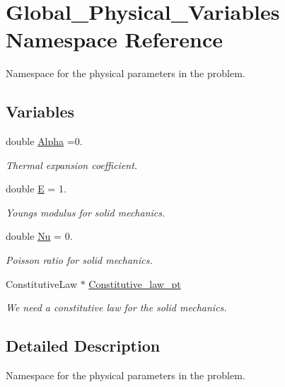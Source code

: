\hypertarget{namespaceGlobal__Physical__Variables}{}\section{Global\+\_\+\+Physical\+\_\+\+Variables Namespace Reference}
\label{namespaceGlobal__Physical__Variables}


Namespace for the physical parameters in the problem.  


\subsection*{Variables}
\begin{DoxyCompactItemize}
\item 
double \hyperlink{namespaceGlobal__Physical__Variables_aa2e802ee7cc8e1ac900ba94c3ce86eb7}{Alpha} =0.
\begin{DoxyCompactList}\small\item\em Thermal expansion coefficient. \end{DoxyCompactList}\item 
double \hyperlink{namespaceGlobal__Physical__Variables_a09a019474b7405b35da2437f7779bc7e}{E} = 1.
\begin{DoxyCompactList}\small\item\em Young\textquotesingle{}s modulus for solid mechanics. \end{DoxyCompactList}\item 
double \hyperlink{namespaceGlobal__Physical__Variables_a3962c36313826b19f216f6bbbdd6a477}{Nu} = 0.
\begin{DoxyCompactList}\small\item\em Poisson ratio for solid mechanics. \end{DoxyCompactList}\item 
Constitutive\+Law $\ast$ \hyperlink{namespaceGlobal__Physical__Variables_a2a37fb040c832ee7a086bb13bb02a100}{Constitutive\+\_\+law\+\_\+pt}
\begin{DoxyCompactList}\small\item\em We need a constitutive law for the solid mechanics. \end{DoxyCompactList}\end{DoxyCompactItemize}


\subsection{Detailed Description}
Namespace for the physical parameters in the problem. 

